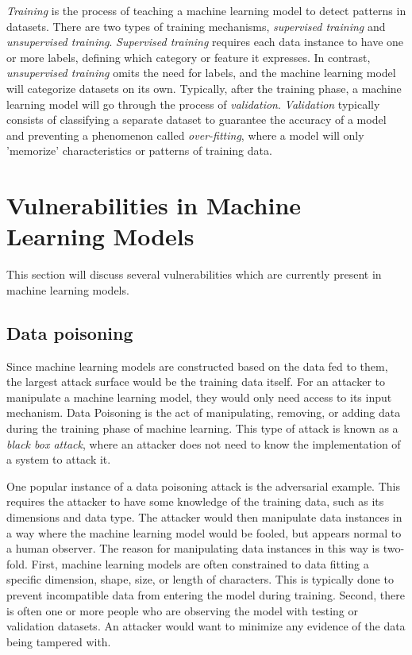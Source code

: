 \documentclass[11pt,conference]{IEEEtran}
\begin{document}
\emph{Training} is the process of teaching a machine learning model to detect patterns
in datasets. There are two types of training mechanisms, \emph{supervised
training} and \emph{unsupervised training}. \emph{Supervised training} requires
each data instance to have one or more labels, defining which category or
feature it expresses. In contrast, \emph{unsupervised training} omits the need
for labels, and the machine learning model will categorize datasets on its own.
Typically, after the training phase, a machine learning model will go through
the process of \emph{validation}. \emph{Validation} typically consists of
classifying a separate dataset to guarantee the accuracy of a model and
preventing a phenomenon called \emph{over-fitting}, where a model will only
'memorize' characteristics or patterns of training data.

\section{Vulnerabilities in Machine Learning Models}
This section will discuss several vulnerabilities which are currently present
in machine learning models.

\subsection{Data poisoning}
Since machine learning models are constructed based on the data fed to them,
the largest attack surface would be the training data itself. For an attacker
to manipulate a machine learning model, they would only need access to its
input mechanism. Data Poisoning is the act of manipulating, removing, or adding
data during the training phase of machine learning. This type of attack is
known as a \emph{black box attack}, where an attacker does not need to know the
implementation of a system to attack it.

One popular instance of a data poisoning attack is the adversarial
example. This requires the attacker to have some knowledge of the
training data, such as its dimensions and data type. The attacker would then
manipulate data instances in a way where the machine learning model would
be fooled, but appears normal to a human observer. The reason for manipulating
data instances in this way is two-fold. First, machine learning models are
often constrained to data fitting a specific dimension, shape, size, or length
of characters. This is typically done to prevent incompatible data from
entering the model during training. Second, there is often one or more people
who are observing the model with testing or validation datasets. An attacker
would want to minimize any evidence of the data being tampered with.
\end{document}
